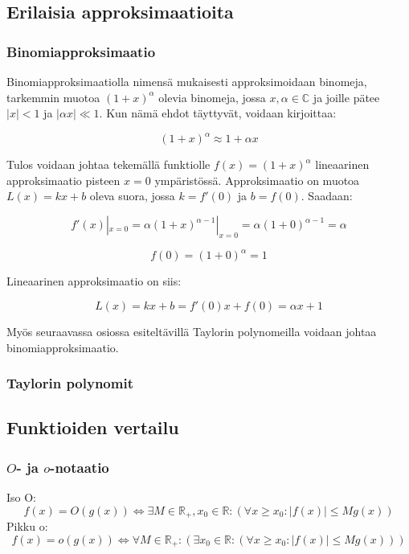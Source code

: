 \documentclass[../johdoksia.tex]{subfiles}
\begin{document}
	\subsection{Erilaisia approksimaatioita}
	
	\subsubsection{Binomiapproksimaatio}
	
	Binomiapproksimaatiolla nimensä mukaisesti approksimoidaan binomeja, tarkemmin muotoa $(1 + x)^\alpha$ olevia binomeja, jossa $x,\alpha \in \mathbb{C}$ ja joille pätee $|x| < 1$ ja $|\alpha x| \ll 1$. Kun nämä ehdot täyttyvät, voidaan kirjoittaa:
	
	\begin{equation}
		(1 + x)^\alpha \approx 1 + \alpha x
	\end{equation}

	Tulos voidaan johtaa tekemällä funktiolle $f(x) = (1 + x)^\alpha$ lineaarinen approksimaatio pisteen $x = 0$ ympäristössä. Approksimaatio on muotoa $L(x) = kx + b$ oleva suora, jossa $k = f'(0)$ ja $b = f(0)$. Saadaan:
	
	\begin{equation*}
		f'(x)|_{x = 0} = \alpha(1 + x)^{\alpha - 1}|_{x = 0} = \alpha(1 + 0)^{\alpha - 1} = \alpha
	\end{equation*} 

	\begin{equation*}
		f(0) = (1 + 0)^{\alpha} = 1
	\end{equation*}

	Lineaarinen approksimaatio on siis:
	
	\begin{equation*}
		L(x) = kx + b = f'(0)x + f(0) = \alpha x + 1
	\end{equation*}

	Myös seuraavassa osiossa esiteltävillä Taylorin polynomeilla voidaan johtaa binomiapproksimaatio.
	
	\subsubsection{Taylorin polynomit}
	
	\subsection{Funktioiden vertailu}
	
	\subsubsection{$O$- ja $o$-notaatio}
		Iso O:
		\begin{equation}
			f(x) = O(g(x)) \iff \exists M \in \mathbb{R}_+, x_0 \in \mathbb{R}: (\forall x \geq x_0: |f(x)| \leq Mg(x))
		\end{equation}
		Pikku o:
		\begin{equation}
			f(x) = o(g(x)) \iff \forall M \in \mathbb{R}_+: (\exists x_0 \in \mathbb{R}: (\forall x \geq x_0: |f(x)| \leq Mg(x)))
		\end{equation}
	
\end{document}
